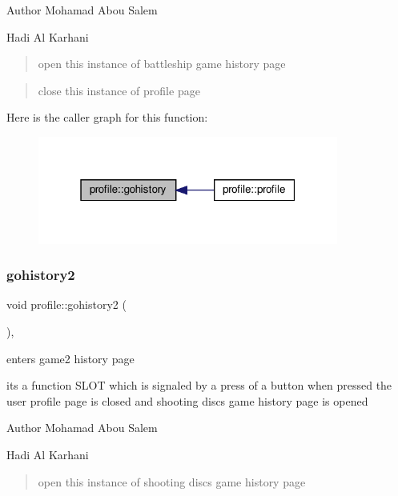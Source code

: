 \begin{DoxyAuthor}{Author}
Mohamad Abou Salem 

Hadi Al Karhani 
\end{DoxyAuthor}
\begin{quote}
open this instance of battleship game history page \end{quote}


\begin{quote}
close this instance of profile page \end{quote}
Here is the caller graph for this function\+:
\nopagebreak
\begin{figure}[H]
\begin{center}
\leavevmode
\includegraphics[width=280pt]{classprofile_a7b83e5727f3cc2e1fcfd8ff6883681d9_icgraph}
\end{center}
\end{figure}
\mbox{\label{classprofile_ae4957e01d43effcf134009d1e302d166}} 
\subsubsection{\texorpdfstring{gohistory2}{gohistory2}}
{\footnotesize\ttfamily void profile\+::gohistory2 (\begin{DoxyParamCaption}{ }\end{DoxyParamCaption})\hspace{0.3cm}{\ttfamily [private]}, {\ttfamily [slot]}}



enters game2 history page 

its a function S\+L\+OT which is signaled by a press of a button when pressed the user profile page is closed and shooting discs game history page is opened

\begin{DoxyAuthor}{Author}
Mohamad Abou Salem 

Hadi Al Karhani 
\end{DoxyAuthor}
\begin{quote}
open this instance of shooting discs game history page \end{quote}


